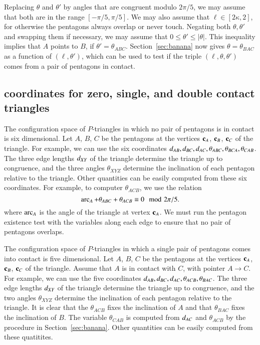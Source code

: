 Replacing $\theta$ and $\theta'$ by angles that are congruent modulo $2\pi/5$, we may assume that
both are in the range $[-\pi/5,\pi/5]$.  We may also assume that $\ell\in [2\kappa,2]$, for otherwise
the pentagons always overlap or never touch.  Negating both $\theta,\theta'$ and swapping them if necessary,
we may assume that $0\le \theta' \le |\theta|$.  This inequality implies that $A$ points to $B$, if
$\theta'=\theta_{ABC}$.  Section~\ref{sec:banana} now gives $\theta=\theta_{BAC}$ as a function
of $(\ell,\theta')$, which can be used to test if the triple $(\ell,\theta,\theta')$ comes from a 
pair of pentagons in contact.

\subsection{coordinates for zero,  single, and double contact triangles}

The configuration space of $P$-triangles in which no pair of pentagons is in contact
is six dimensional.  Let $A$, $B$, $C$ be the pentagons at the vertices ${\mathbf c}_A$, ${\mathbf c}_B$, ${\mathbf c}_C$
of the triangle.  For example, we can use the six coordinates $d_{AB},d_{BC},d_{AC},\theta_{ABC},\theta_{BCA},\theta_{CAB}$.
The three edge lengths $d_{XY}$ of the triangle determine the triangle up to congruence, and the
three angles $\theta_{XYZ}$ determine the inclination of each pentagon relative to the triangle.
Other quantities can be easily computed from these six coordinates.  For example, to computer $\theta_{ACB}$,
we use the relation
\[
\operatorname{arc}_A + \theta_{ABC} + \theta_{ACB} \equiv 0\mod 2\pi/5.
\]
where $\operatorname{arc}_A$ is the angle of the triangle at vertex ${\mathbf c}_A$.
We must run the pentagon existence test with the variables along each edge to ensure that
no pair of pentagons overlaps.

The configuration space of $P$-triangles in which a single pair of pentagons comes into contact
is five dimensional.  Let $A$, $B$, $C$ be the pentagons at the vertices ${\mathbf c}_A$, ${\mathbf c}_B$, ${\mathbf c}_C$
of the triangle.  Assume that $A$ is in contact with $C$, with pointer $A\to C$. 
For example, we can use the five coordinates $d_{AB},d_{BC},d_{AC},\theta_{ACB},\theta_{BAC}$.
The three edge lengths $d_{XY}$ of the triangle determine the triangle up to congruence, and the
two angles $\theta_{XYZ}$ determine the inclination of each pentagon relative to the triangle.
It is clear that the $\theta_{ACB}$ fixes the inclination of $A$ and that $\theta_{BAC}$ fixes the
inclination of $B$.  The variable $\theta_{CAB}$ is computed from $d_{AC}$ and $\theta_{ACB}$
by the procedure in Section~\ref{sec:banana}.
Other quantities can be easily computed from these  quatitites.  

